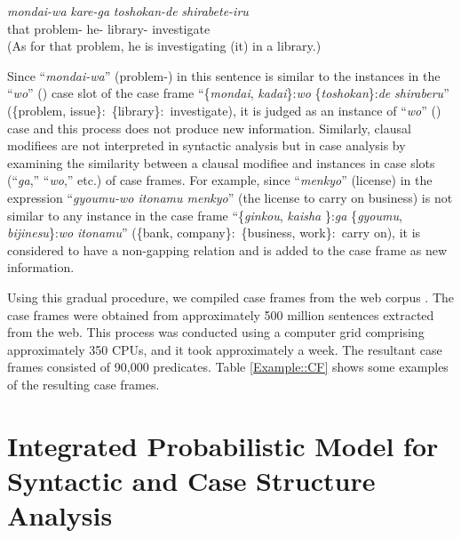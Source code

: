 \documentclass[english]{jnlp_1.4_rep}
\newcommand{\nom}{}
\newcommand{\acc}{}
\newcommand{\loc}{}
\newcommand{\TOP}{}
\begin{document}
\begin{exe}
\ex
  {\textit{mondai-wa}} {\textit{kare-ga}} {\textit{toshokan-de}} {\textit{shirabete-iru}} \\
      {that} {problem-\TOP} {he-\nom} {library-\loc} {investigate} \\
 \trans (As for that problem, he is investigating (it) in a library.)
\end{exe}

Since ``\textit{mondai-wa}'' (problem-\TOP) in this sentence is similar
to the instances in the ``\textit{wo}'' (\acc) case slot of the case
frame ``\{\textit{mondai}, \textit{kadai}\}:\textit{wo}
\{\textit{toshokan}\}:\textit{de} \textit{shiraberu}'' (\{problem,
issue\}:\acc\ \{library\}:\loc\ investigate), it is judged as an
instance of ``\textit{wo}'' (\acc) case and this process does not
produce new information. Similarly, clausal modifiees are not
interpreted in syntactic analysis but in case analysis by
examining the similarity between a clausal modifiee and instances in
case slots (``\textit{ga},'' ``\textit{wo},'' etc.) of case
frames. For example, since ``\textit{menkyo}'' (license) in the
expression ``\textit{gyoumu-wo itonamu menkyo}'' (the license to carry
on business) is not similar to any instance in the case frame
``\{\textit{ginkou}, \textit{kaisha} \}:\textit{ga} \{\textit{gyoumu},
\textit{bijinesu}\}:\textit{wo} \textit{itonamu}'' (\{bank,
company\}:\nom\ \{business, work\}:\acc\ carry on), it is considered to
have a non-gapping relation and is added to the case frame as new
information.

\begin{table}[b]
 \label{Example::CF}

\end{table}

Using this gradual procedure, we compiled case frames from the web
corpus \cite{Kawahara2006}. The case frames were obtained from
approximately 500 million sentences extracted from the web. This process was
conducted using a computer grid comprising approximately 350 CPUs, and it
took approximately a week. The resultant case frames consisted of 90,000
predicates. Table \ref{Example::CF} shows some examples of the
resulting case frames.


\section{Integrated Probabilistic Model for Syntactic and Case Structure Analysis}
\end{document}
